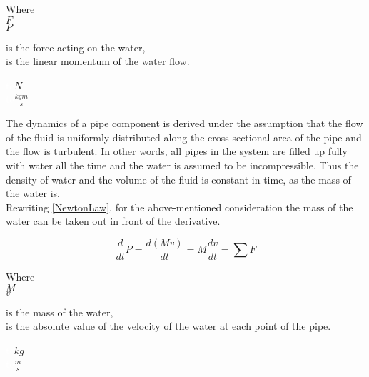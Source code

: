 \begin{minipage}[t]{0.20\textwidth}
Where\\
\hspace*{8mm} $F$ \\
\hspace*{8mm} $P$ 
\end{minipage}
\begin{minipage}[t]{0.68\textwidth}
\vspace*{2mm}
is the force acting on the water,\\
is the linear momentum of the water flow.

\end{minipage}
\begin{minipage}[t]{0.10\textwidth}
\vspace*{2mm}
\textcolor{White}{te}$\unit{N}$\\
\textcolor{White}{te}$\unit{\frac{kgm}{s}}$
\end{minipage}

The dynamics of a pipe component is derived under the assumption that the flow of the fluid is uniformly distributed along the cross sectional area of the pipe and the flow is turbulent. In other words, all pipes in the system are filled up fully with water all the time and the water is assumed to be incompressible. Thus the density of water and the volume of the fluid is constant in time, as the mass of the water is.
\\
Rewriting \eqref{NewtonLaw}, for the above-mentioned consideration the mass of the water can be taken out in front of the derivative.

\begin{equation}
  \frac{d}{dt} P = {\frac{d(M v)}{dt}} = M \frac{dv}{dt} = \sum F
\end{equation} 

\begin{minipage}[t]{0.20\textwidth}
Where\\
\hspace*{8mm} $M$ \\
\hspace*{8mm} $v$ 
\end{minipage}
\begin{minipage}[t]{0.68\textwidth}
\vspace*{2mm}
is the mass of the water,\\
is the absolute value of the velocity of the water at each point of the pipe.

\end{minipage}
\begin{minipage}[t]{0.10\textwidth}
\vspace*{2mm}
\textcolor{White}{te}$\unit{kg}$\\
\textcolor{White}{te}$\unit{\frac{m}{s}}$
\end{minipage}

